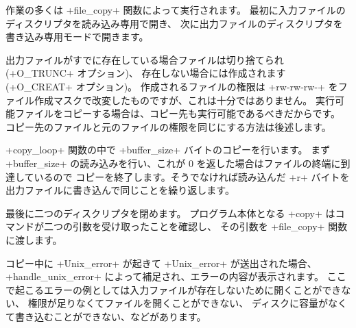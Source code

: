 作業の多くは \ml+file_copy+ 関数によって実行されます。
最初に入力ファイルのディスクリプタを読み込み専用で開き、
次に出力ファイルのディスクリプタを書き込み専用モードで開きます。

出力ファイルがすでに存在している場合ファイルは切り捨てられ (\ml+O_TRUNC+ オプション)、
存在しない場合には作成されます (\ml+O_CREAT+ オプション)。
作成されるファイルの権限は \ml+rw-rw-rw-+ をファイル作成マスクで改変したものですが、これは十分ではありません。
実行可能ファイルをコピーする場合は、コピー先も実行可能であるべきだからです。
コピー先のファイルと元のファイルの権限を同じにする方法は後述します。

\ml+copy_loop+ 関数の中で \ml+buffer_size+ バイトのコピーを行います。
まず\ml+buffer_size+ の読み込みを行い、これが 0 を返した場合はファイルの終端に到達しているので
コピーを終了します。そうでなければ読み込んだ \ml+r+ バイトを出力ファイルに書き込んで同じことを繰り返します。

最後に二つのディスクリプタを閉めます。
プログラム本体となる \ml+copy+ はコマンドが二つの引数を受け取ったことを確認し、
その引数を \ml+file_copy+ 関数に渡します。

コピー中に \ml+Unix_error+ が起きて \ml+Unix_error+ が送出された場合、
\ml+handle_unix_error+ によって補足され、エラーの内容が表示されます。
ここで起こるエラーの例としては入力ファイルが存在しないために開くことができない、
権限が足りなくてファイルを開くことができない、
ディスクに容量がなくて書き込むことができない、などがあります。


